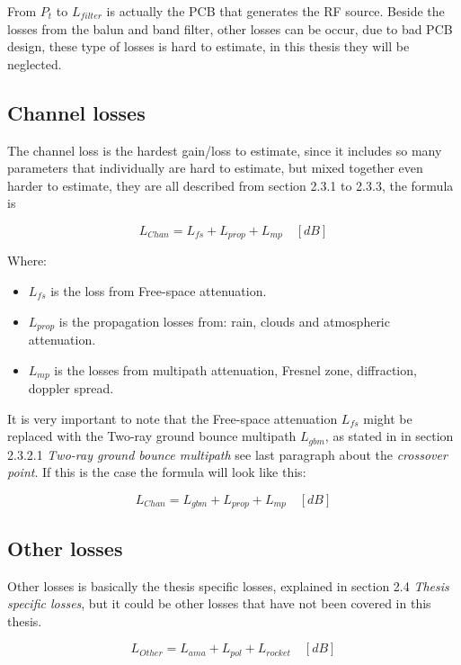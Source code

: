 From $P_t$ to $L_{filter}$ is actually the PCB that generates the RF source. Beside the losses from the balun and band filter, other losses can be occur, due to bad PCB design, these type of losses is hard to estimate, in this thesis they will be neglected.

\subsection{Channel losses}
The channel loss is the hardest gain/loss to estimate, since it includes so many parameters that individually are hard to estimate, but mixed together even harder to estimate, they are all described from section 2.3.1 to 2.3.3, the formula is 

\begin{equation}
   L_{Chan} = L_{fs}+L_{prop}+L_{mp} \quad [dB]
\end{equation}

Where:

\begin{itemize}
    \item $L_{fs}$ is the loss from Free-space attenuation.
    \item $L_{prop}$ is the propagation losses from: rain, clouds and atmospheric attenuation.
    \item $L_{mp}$ is the losses from multipath attenuation, Fresnel zone, diffraction, doppler spread.
\end{itemize}

It is very important to note that the Free-space attenuation $L_{fs}$ might be replaced with the Two-ray ground bounce multipath $L_{gbm}$, as stated in in section 2.3.2.1 \textit{Two-ray ground bounce multipath} see last paragraph about the \textit{crossover point}. If this is the case the formula will look like this:

\begin{equation}
   L_{Chan} = L_{gbm}+L_{prop}+L_{mp} \quad [dB]
\end{equation}

\subsection{Other losses}
Other losses is basically the thesis specific losses, explained in section 2.4 \textit{Thesis specific losses}, but it could be other losses that have not been covered in this thesis.

\begin{equation}
   L_{Other} = L_{ama}+L_{pol}+L_{rocket} \quad [dB]
\end{equation}

